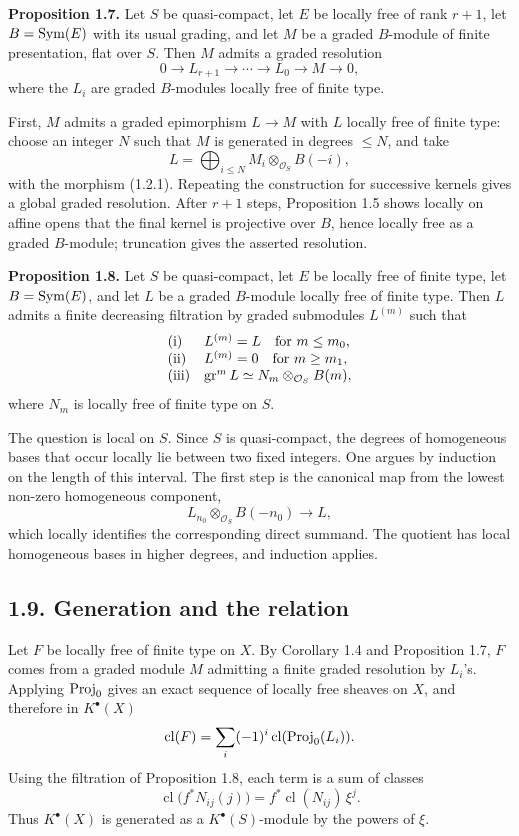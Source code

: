 \documentclass[11pt]{article}
\newcommand{\cl}{\operatorname{cl}}
\begin{document}
\textbf{Proposition 1.7.} Let \(S\) be quasi-compact, let \(E\) be locally free of rank \(r+1\), let \(B=\operatorname{Sym}(E)\) with its usual grading, and let \(M\) be a graded \(B\)-module of finite presentation, flat over \(S\). Then \(M\) admits a graded resolution
\[
  0\longrightarrow L_{r+1}\longrightarrow\cdots\longrightarrow L_0\longrightarrow M\longrightarrow 0,
\]
where the \(L_i\) are graded \(B\)-modules locally free of finite type.

First, \(M\) admits a graded epimorphism \(L\to M\) with \(L\) locally free of finite type: choose an integer \(N\) such that \(M\) is generated in degrees \(\leq N\), and take
\[
  L=\bigoplus_{i\leq N} M_i\otimes_{\mathcal O_S} B(-i),
\]
with the morphism (1.2.1). Repeating the construction for successive kernels gives a global graded resolution. After \(r+1\) steps, Proposition 1.5 shows locally on affine opens that the final kernel is projective over \(B\), hence locally free as a graded \(B\)-module; truncation gives the asserted resolution.

\textbf{Proposition 1.8.} Let \(S\) be quasi-compact, let \(E\) be locally free of finite type, let \(B=\operatorname{Sym}(E)\), and let \(L\) be a graded \(B\)-module locally free of finite type. Then \(L\) admits a finite decreasing filtration by graded submodules \(L^{(m)}\) such that
\[
\begin{array}{ll}
\text{\rm (i)}& L^{(m)}=L\quad\text{for }m\leq m_0,\\
\text{\rm (ii)}& L^{(m)}=0\quad\text{for }m\geq m_1,\\
\text{\rm (iii)}& \operatorname{gr}^m L
  \simeq N_m\otimes_{\mathcal O_S}B(m),
\end{array}
\]
where \(N_m\) is locally free of finite type on \(S\).

The question is local on \(S\). Since \(S\) is quasi-compact, the degrees of homogeneous bases that occur locally lie between two fixed integers. One argues by induction on the length of this interval. The first step is the canonical map from the lowest non-zero homogeneous component,
\[
  L_{n_0}\otimes_{\mathcal O_S}B(-n_0)\longrightarrow L,
\]
which locally identifies the corresponding direct summand. The quotient has local homogeneous bases in higher degrees, and induction applies.

\subsection*{1.9. Generation and the relation}
Let \(F\) be locally free of finite type on \(X\). By Corollary 1.4 and Proposition 1.7, \(F\) comes from a graded module \(M\) admitting a finite graded resolution by \(L_i\)'s. Applying \(\operatorname{Proj}_0\) gives an exact sequence of locally free sheaves on \(X\), and therefore in \(K^\bullet(X)\)
\[
  \cl(F)=\sum_i(-1)^i\cl(\Proj_0(L_i)).
\]
Using the filtration of Proposition 1.8, each term is a sum of classes
\[
  \cl\bigl(f^*N_{ij}(j)\bigr)=f^*\cl(N_{ij})\,\xi^j .
\]
Thus \(K^\bullet(X)\) is generated as a \(K^\bullet(S)\)-module by the powers of \(\xi\).
\end{document}
